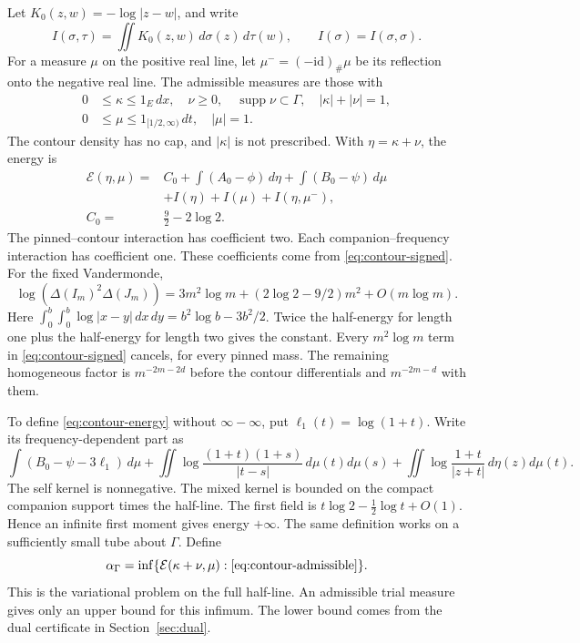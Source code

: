 Let \(K_0(z,w)=-\log|z-w|\), and write
\[
 I(\sigma,\tau)=\iint K_0(z,w)\,d\sigma(z)\,d\tau(w),
 \qquad I(\sigma)=I(\sigma,\sigma).
\]
For a measure \(\mu\) on the positive real line, let
\(\mu^-=(-\mathrm{id})_\#\mu\) be its reflection onto the negative real line.
The admissible measures are those with
\begin{equation}\label{eq:contour-admissible}
 \begin{aligned}
 0&\le\kappa\le1_E\,dx,\quad \nu\ge0,\quad
   \operatorname{supp}\nu\subset\Gamma,\quad |\kappa|+|\nu|=1,\\
 0&\le\mu\le1_{[1/2,\infty)}\,dt,\quad |\mu|=1.
 \end{aligned}
\end{equation}
The contour density has no cap, and \(|\kappa|\) is not prescribed.
With \(\eta=\kappa+\nu\), the energy is
\begin{equation}\label{eq:contour-energy}
 \begin{aligned}
 \mathcal E(\eta,\mu)={}&C_0+\int(A_0-\phi)\,d\eta
            +\int(B_0-\psi)\,d\mu\\
            &+I(\eta)+I(\mu)+I(\eta,\mu^-),\\
 C_0={}&\tfrac92-2\log2.
 \end{aligned}
\end{equation}
The pinned--contour interaction has coefficient two. Each
companion--frequency interaction has coefficient one. These coefficients
come from \eqref{eq:contour-signed}. For the fixed Vandermonde,
\[
 \log(\Delta(I_m)^2\Delta(J_m))
 =3m^2\log m+(2\log2-9/2)m^2+O(m\log m).
\]
Here \(\int_0^b\!\int_0^b\log|x-y|\,dx\,dy=b^2\log b-3b^2/2\). Twice the
half-energy for length one plus the half-energy for length two gives the
constant. Every \(m^2\log m\) term in \eqref{eq:contour-signed} cancels, for
every pinned mass. The remaining homogeneous factor is \(m^{-2m-2d}\)
before the contour differentials and \(m^{-2m-d}\) with them.

To define \eqref{eq:contour-energy} without \(\infty-\infty\), put
\(\ell_1(t)=\log(1+t)\). Write its frequency-dependent part as
\begin{equation}\label{eq:contour-regularized}
 \int(B_0-\psi-3\ell_1)\,d\mu
 +\iint\log\frac{(1+t)(1+s)}{|t-s|}\,d\mu(t)d\mu(s)
 +\iint\log\frac{1+t}{|z+t|}\,d\eta(z)d\mu(t).
\end{equation}
The self kernel is nonnegative. The mixed kernel is bounded on the compact
companion support times the half-line. The first field is
\(t\log2-\frac12\log t+O(1)\). Hence an infinite first moment gives energy
\(+\infty\). The same definition works on a sufficiently small tube about
\(\Gamma\). Define
\begin{equation}\label{eq:contour-alpha}
 \alpha_\Gamma=\inf\{\mathcal E(\kappa+\nu,\mu):
   \eqref{eq:contour-admissible}\}.
\end{equation}
This is the variational problem on the full half-line. An admissible trial
measure gives only an upper bound for this infimum. The lower bound comes
from the dual certificate in Section~\ref{sec:dual}.
